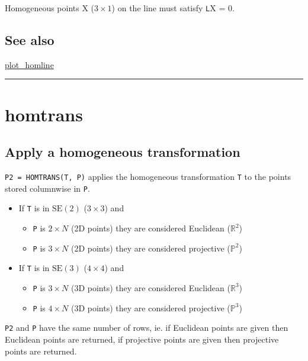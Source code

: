 Homogeneous points X ($3 \times 1$) on the line must satisfy \texttt{L}\textquotesingle *X = 0.


\subsection*{See also}


\hyperlink{plot_homline}{\color{blue} plot\_homline}

\vspace{1.5ex}\rule{\textwidth}{1mm}

\hypertarget{homtrans}{\section*{homtrans}}
\subsection*{Apply a homogeneous transformation}


\texttt{P2 = HOMTRANS(T, P)} applies the homogeneous transformation \texttt{T} to the points
stored columnwise in \texttt{P}.

\begin{itemize}
  \item If \texttt{T} is in $\mbox{SE}(2)$ ($3 \times 3$) and
\begin{itemize}
  \item \texttt{P} is $2 \times N$ (2D points) they are considered Euclidean ($\mathbb{R}^{2}$)
  \item \texttt{P} is $3 \times N$ (2D points) they are considered projective ($\mathbb{P}^{2}$)
\end{itemize}
  \item If \texttt{T} is in $\mbox{SE}(3)$ ($4 \times 4$) and
\begin{itemize}
  \item \texttt{P} is $3 \times N$ (3D points) they are considered Euclidean ($\mathbb{R}^{3}$)
  \item \texttt{P} is $4 \times N$ (3D points) they are considered projective ($\mathbb{P}^{3}$)
\end{itemize}
\end{itemize}


\texttt{P2} and \texttt{P} have the same number of rows, ie. if Euclidean points are given
then Euclidean points are returned, if projective points are given then
projective points are returned.



